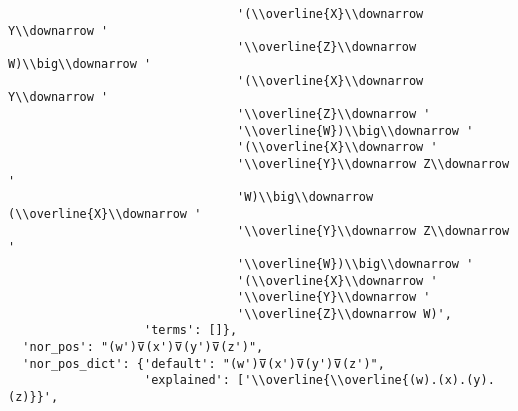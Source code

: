 \begin{verbatim}
                                '(\\overline{X}\\downarrow Y\\downarrow '
                                '\\overline{Z}\\downarrow W)\\big\\downarrow '
                                '(\\overline{X}\\downarrow Y\\downarrow '
                                '\\overline{Z}\\downarrow '
                                '\\overline{W})\\big\\downarrow '
                                '(\\overline{X}\\downarrow '
                                '\\overline{Y}\\downarrow Z\\downarrow '
                                'W)\\big\\downarrow (\\overline{X}\\downarrow '
                                '\\overline{Y}\\downarrow Z\\downarrow '
                                '\\overline{W})\\big\\downarrow '
                                '(\\overline{X}\\downarrow '
                                '\\overline{Y}\\downarrow '
                                '\\overline{Z}\\downarrow W)',
                   'terms': []},
  'nor_pos': "(w')⊽(x')⊽(y')⊽(z')",
  'nor_pos_dict': {'default': "(w')⊽(x')⊽(y')⊽(z')",
                   'explained': ['\\overline{\\overline{(w).(x).(y).(z)}}',

\end{verbatim}
